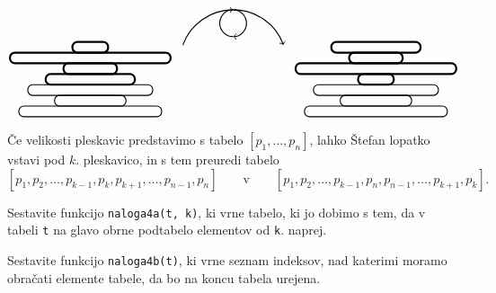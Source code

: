 \documentclass[arhiv]{izpit}
\begin{document}
\[\begin{tikzpicture}[rounded corners, xscale = 0.5, thick]
  \begin{scope}[xshift = -8cm, yscale = 0.3]
    \draw[ultra thick] (-1, 6) rectangle (1, 7);
    \draw[ultra thick] (-4.5, 5) rectangle (4.5, 6);
    \draw[ultra thick] (-1.5, 4) rectangle (1.5, 5);
    \draw[ultra thick] (-2.5, 3) rectangle (2.5, 4);
    \draw (-3.5, 2) rectangle (3.5, 3);
    \draw (-2, 1) rectangle (2, 2);
    \draw (-4, 0) rectangle (4, 1);    
  \end{scope}
  \begin{scope}[yshift = 1.5cm, yscale = 0.5]
    \draw (0, 3) arc (90:160:3cm);
    \draw[->] (0, 3) arc (90:-90:0.75cm);
    \draw[<-] (0, 3) arc (90:270:0.75cm);
    \draw[->] (0, 3) arc (90:20:3cm);
    \end{scope}
  \begin{scope}[xshift = 8cm, yscale = 0.3]
    \draw[ultra thick] (-2.5, 6) rectangle (2.5, 7);
    \draw[ultra thick] (-1.5, 5) rectangle (1.5, 6);
    \draw[ultra thick] (-4.5, 4) rectangle (4.5, 5);
    \draw[ultra thick] (-1, 3) rectangle (1, 4);
    \draw (-3.5, 2) rectangle (3.5, 3);
    \draw (-2, 1) rectangle (2, 2);
    \draw (-4, 0) rectangle (4, 1);    
  \end{scope}
\end{tikzpicture}\]

Če velikosti pleskavic predstavimo s tabelo $[p_1, \dots, p_n]$,
lahko Štefan lopatko vstavi pod $k$. pleskavico, in s tem preuredi tabelo
\[
  [p_1, p_2, \dots, p_{k - 1}, p_k, p_{k + 1}, \dots, p_{n - 1}, p_n]
  \qquad\text{v}\qquad
  [p_1, p_2, \dots, p_{k - 1}, p_n, p_{n - 1}, \dots, p_{k + 1}, p_k].
\]

\podnaloga[5 točk]
  Sestavite funkcijo \verb|naloga4a(t, k)|,
  ki vrne tabelo, ki jo dobimo s tem,
  da v tabeli \verb|t| na glavo obrne podtabelo elementov od \verb|k|. naprej.

\podnaloga[20+ točk]
  Sestavite funkcijo \verb|naloga4b(t)|,
  ki vrne seznam indeksov, nad katerimi moramo obračati elemente tabele,
  da bo na koncu tabela urejena.
\end{document}
